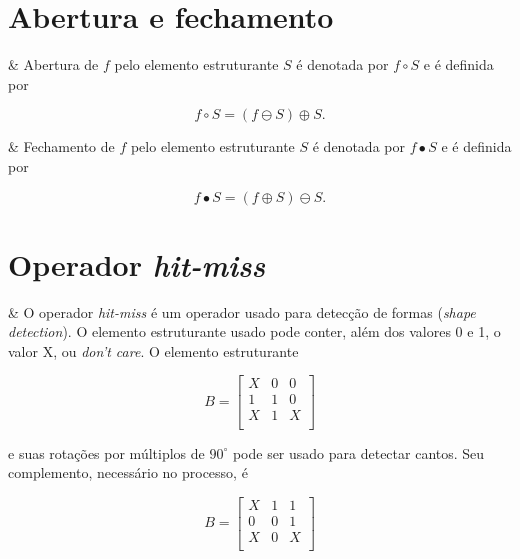 \section{Abertura e fechamento}

\begin{easylist}

  & Abertura de $f$ pelo elemento estruturante $S$ é denotada por $f \circ S$ e é definida por

  \[ f \circ S = (f \ominus S) \oplus S. \]

  & Fechamento de $f$ pelo elemento estruturante $S$ é denotada por $f \bullet S$ e é definida por

  \[ f \bullet S = (f \oplus S) \ominus S. \]

\end{easylist}


\section{Operador \textit{hit-miss}}

\begin{easylist}

  & O operador \textit{hit-miss} é um operador usado para detecção de formas (\textit{shape detection}). O elemento estruturante usado pode conter, além dos valores 0 e 1, o valor X, ou \textit{don't care}. O elemento estruturante

  \end{easylist}

  \[
    B = 
    \begin{bmatrix}
      X & 0 & 0 \\
      1 & 1 & 0 \\
      X & 1 & X \\
    \end{bmatrix}  
  \]
    
\begin{easylist}

  e suas rotações por múltiplos de $90^\circ$ pode ser usado para detectar cantos. Seu complemento, necessário no processo, é

\end{easylist}
  
  \[
    B = 
    \begin{bmatrix}
      X & 1 & 1 \\
      0 & 0 & 1 \\
      X & 0 & X \\
    \end{bmatrix}  
  \]

